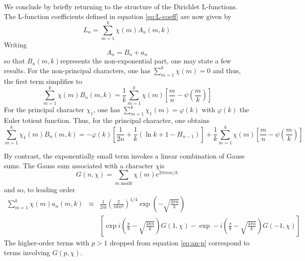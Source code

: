 \documentclass{amsart}
\begin{document}
We conclude by briefly returning to the structure of the Dirichlet
L-functions. The L-function coefficients defined in equation \ref{eq:L-coeff}
are now given by \begin{equation}
L_{n}=\sum_{m=1}^{k}\chi(m)A_{n}(m,k)\label{eq:}\end{equation}
 Writing \begin{equation}
A_{n}=B_{n}+a_{n}\label{eq:}\end{equation}
 so that $B_{n}(m,k)$represents the non-exponential part, one may
state a few results. For the non-principal characters, one has $\sum_{m=1}^{k}\chi(m)=0$
and thus, the first term simplifies to \begin{equation}
\sum_{m=1}^{k}\chi(m)B_{n}(m,k)=\frac{1}{k}\sum_{m=1}^{k}\chi(m)\left[\frac{m}{n}-\psi\left(\frac{m}{k}\right)\right]\label{eq:}\end{equation}
 For the principal character $\chi_{1}$, one has $\sum_{m=1}^{k}\chi_{1}(m)=\varphi(k)$
with $\varphi(k)$ the Euler totient function. Thus, for the principal
character, one obtains \begin{equation}
\sum_{m=1}^{k}\chi_{1}(m)B_{n}(m,k)=-\varphi(k)\left[\frac{1}{2n}+\frac{1}{k}\left(\ln k+1-H_{n-1}\right)\right]+\frac{1}{k}\sum_{m=1}^{k}\chi(m)\left[\frac{m}{n}-\psi\left(\frac{m}{k}\right)\right]\label{eq:}\end{equation}


By contrast, the exponentially small term invokes a linear combination
of Gauss sums. The Gauss sum associated with a character $\chi$is
\begin{equation}
G(n,\chi)=\sum_{m\mbox{ mod}k}\chi(m)e^{2\pi imn/k}\label{eq:}\end{equation}
 and so, to leading order \begin{eqnarray}
\sum_{m=1}^{k}\chi(m)a_{n}(m,k) & \approx & \frac{1}{2ik}\left(\frac{2}{\pi kn^{3}}\right)^{1/4}\exp\left(-\sqrt{\frac{4\pi n}{k}}\right)\nonumber \\
 &  & \left[\exp i\left(\frac{\pi}{8}-\sqrt{\frac{4\pi n}{k}}\right)G(1,\chi)-\exp-i\left(\frac{\pi}{8}-\sqrt{\frac{4\pi n}{k}}\right)G(-1,\chi)\right]\label{eq:}\end{eqnarray}
 The higher-order terms with $p>1$ dropped from equation \ref{eq:an-p}
correspond to terms involving $G(p,\chi)$. 


\begin{comment}
TODO -- The Hurwitz zeta can be avoided entirely by working directly
with the functional equation for the L-functions, as given by Apostol,
Chapter 12, Theorem 12.11. The direct form seems to imply some sort
of result/constraint on the $p\ne1$ terms in the expansion. It also
suggests that most of the deriviation above could be made clearer
by assuming a generic functional equation, and stating results in
terms of that. (e.g. assume Selberg-class type functional equation). 
\end{comment}
\end{document}
